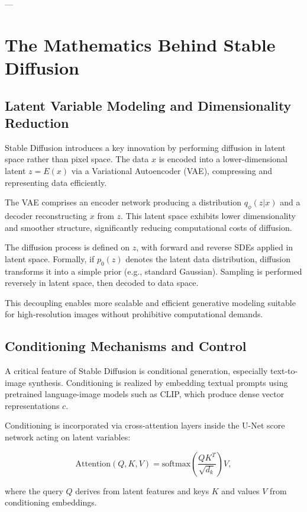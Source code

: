 \documentclass[a4paper,12pt,oneside]{memoir}
\begin{document}
---

\chapter{The Mathematics Behind Stable Diffusion}

\section{Latent Variable Modeling and Dimensionality Reduction}

Stable Diffusion introduces a key innovation by performing diffusion in latent space rather than pixel space. The data \( x \) is encoded into a lower-dimensional latent \( z = E(x) \) via a Variational Autoencoder (VAE), compressing and representing data efficiently.

The VAE comprises an encoder network producing a distribution \( q_\phi(z|x) \) and a decoder reconstructing \( x \) from \( z \). This latent space exhibits lower dimensionality and smoother structure, significantly reducing computational costs of diffusion.

The diffusion process is defined on \( z \), with forward and reverse SDEs applied in latent space. Formally, if \( p_0(z) \) denotes the latent data distribution, diffusion transforms it into a simple prior (e.g., standard Gaussian). Sampling is performed reversely in latent space, then decoded to data space.

This decoupling enables more scalable and efficient generative modeling suitable for high-resolution images without prohibitive computational demands.

\section{Conditioning Mechanisms and Control}

A critical feature of Stable Diffusion is conditional generation, especially text-to-image synthesis. Conditioning is realized by embedding textual prompts using pretrained language-image models such as CLIP, which produce dense vector representations \( c \).

Conditioning is incorporated via cross-attention layers inside the U-Net score network acting on latent variables:

\[
\text{Attention}(Q,K,V) = \text{softmax}\left(\frac{QK^T}{\sqrt{d_k}}\right) V,
\]

where the query \( Q \) derives from latent features and keys \( K \) and values \( V \) from conditioning embeddings.
\end{document}
